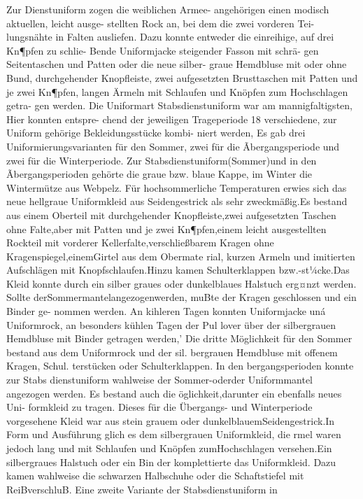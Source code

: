 Zur Dienstuniform zogen die weiblichen Armee-
angehörigen einen modisch aktuellen, leicht ausge-
stellten Rock an, bei dem die zwei vorderen Tei-
lungsnähte in Falten ausliefen. Dazu konnte
entweder die einreihige, auf drei Kn¶pfen zu schlie-
Bende Uniformjacke steigender Fasson mit schrä-
gen Seitentaschen und Patten oder die neue silber-
graue Hemdbluse mit oder ohne Bund, durchgehender Knopfleiste, zwei aufgesetzten Brusttaschen
mit Patten und je zwei Kn¶pfen, langen Ärmeln mit
Schlaufen und Knöpfen zum Hochschlagen getra-
gen werden. Die Uniformart Stabsdienstuniform
war am mannigfaltigsten, Hier konnten entspre-
chend der jeweiligen Trageperiode 18 verschiedene,
zur Uniform gehörige Bekleidungsstücke kombi-
niert werden, Es gab drei Uniformierungsvarianten
für den Sommer, zwei für die Ãbergangsperiode
und zwei für die Winterperiode.
Zur Stabsdienstuniform(Sommer)und in den
Ãbergangsperioden gehörte die graue bzw. blaue
Kappe, im Winter die Wintermütze aus Webpelz. Für hochsommerliche Temperaturen erwies sich
das neue hellgraue Uniformkleid aus Seidengestrick
als sehr zweckmäßig.Es bestand aus einem Oberteil
mit durchgehender Knopfleiste,zwei aufgesetzten
Taschen ohne Falte,aber mit Patten und je zwei
Kn¶pfen,einem leicht ausgestellten Rockteil mit
vorderer Kellerfalte,verschließbarem Kragen ohne
Kragenspiegel,einemGirtel aus dem Obermate
rial, kurzen Armeln und imitierten Aufschlägen mit
Knopfschlaufen.Hinzu kamen Schulterklappen
bzw.-st¼cke.Das Kleid konnte durch ein silber
graues oder dunkelblaues Halstuch erg¤nzt werden.
Sollte derSommermantelangezogenwerden,
muBte der Kragen geschlossen und ein Binder ge-
nommen werden.
An kihleren Tagen konnten Uniformjacke uná
Uniformrock, an besonders kühlen Tagen der Pul
lover über der silbergrauen Hemdbluse mit Binder
getragen werden,' Die dritte Möglichkeit für den
Sommer bestand aus dem Uniformrock und der sil.
bergrauen Hemdbluse mit offenem Kragen, Schul.
terstücken oder Schulterklappen.
In den bergangsperioden konnte zur Stabs
dienstuniform wahlweise der Sommer-oderder
Uniformmantel angezogen werden. Es bestand auch
die öglichkeit,darunter ein ebenfalls neues Uni-
formkleid zu tragen. Dieses für die Übergangs- und
Winterperiode vorgesehene Kleid war aus stein
grauem oder dunkelblauemSeidengestrick.In
Form und Ausführung glich es dem silbergrauen
Uniformkleid, die rmel waren jedoch lang und
mit Schlaufen und Knöpfen zumHochschlagen
versehen.Ein silbergraues Halstuch oder ein Bin
der komplettierte das Uniformkleid. Dazu kamen
wahlweise die schwarzen Halbschuhe oder die
Schaftstiefel mit ReiBverschluB.
Eine zweite Variante der Stabsdienstuniform in
